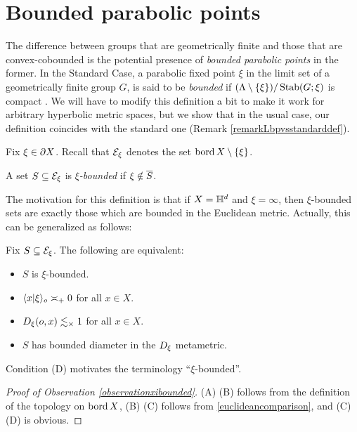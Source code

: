 \bigskip
\section{Bounded parabolic points}

The difference between groups that are geometrically finite and those that are convex-cobounded is the potential presence of \emph{bounded parabolic points} in the former. 
In the Standard Case, a parabolic fixed point $\xi$ in the limit set of a geometrically finite group $G$, is said to be \emph{bounded} if $(\Lambda\setminus\{\xi\})/\operatorname{Stab}(G;\xi)$ is compact \cite[p.272]{Bowditch_geometrical_finiteness}. We will have to modify this definition a bit to make it work for arbitrary hyperbolic metric spaces, but we show that in the usual case, our definition coincides with the standard one (Remark \ref{remarkLbpvsstandarddef}).

Fix $\xi\in\partial X$. Recall that $\mathcal E_\xi$ denotes the set $\operatorname{bord} X\setminus\{\xi\}$.

\begin{definition}
\label{definitionxibounded}
A set $S\subseteq\mathcal E_\xi$ is \emph{$\xi$-bounded} if $\xi\notin\overline S$.
\end{definition}
The motivation for this definition is that if $X = \H^d$ and $\xi = \infty$, then $\xi$-bounded sets are exactly those which are bounded in the Euclidean metric. Actually, this can be generalized as follows:

\begin{observation}
\label{observationxibounded}
Fix $S\subseteq\mathcal E_\xi$. The following are equivalent:
\begin{itemize}
\item[(A)] $S$ is $\xi$-bounded.
\item[(B)] $\langle x|\xi\rangle_o\asymp_+ 0$ for all $x\in X$.
\item[(C)] $D_\xi(o,x)\lesssim_\times 1$ for all $x\in X$.
\item[(D)] $S$ has bounded diameter in the $D_\xi$ metametric.
\end{itemize}
\end{observation}
Condition (D) motivates the terminology ``$\xi$-bounded''.

\begin{proof}[Proof of Observation \ref{observationxibounded}]
(A) \iff (B) follows from the definition of the topology on $\operatorname{bord} X$, (B) \iff (C) follows from \eqref{euclideancomparison}, and (C) \iff (D) is obvious.
\end{proof}

